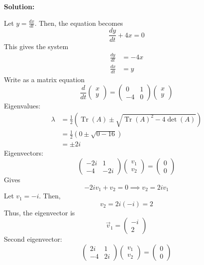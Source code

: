 \documentclass[12pt]{article}
\DeclareMathOperator{\Tr}{Tr}
\newenvironment{solution}{
    \textbf{Solution:}
    
}{
    
    \vspace{2em}
}
\begin{document}
\begin{solution}
    Let \(y = \frac{dx}{dt}\). Then, the equation becomes
    \[
        \frac{dy}{dt} + 4x = 0
    \]
    This gives the system
    \[
        \begin{aligned} 
            \frac{dy}{dt} &= -4x \\
            \frac{dx}{dt} &= y
        \end{aligned}
    \]
    Write as a matrix equation
    \[
        \frac{d}{dt} \begin{pmatrix} x \\ y \end{pmatrix} = \begin{pmatrix} 0 & 1 \\ -4 & 0 \end{pmatrix} \begin{pmatrix} x \\ y \end{pmatrix}
    \]
    Eigenvalues:
    \[
        \begin{aligned}
            \lambda &= \frac{1}{2}(\Tr(A) \pm \sqrt{\Tr(A)^2 - 4\det(A)}) \\
            &= \frac{1}{2}(0 \pm \sqrt{0 - 16}) \\
            &= \pm 2i
        \end{aligned}
    \]
    Eigenvectors:
    \[
        \begin{pmatrix} -2i & 1 \\ -4 & -2i \end{pmatrix} \begin{pmatrix} v_1 \\ v_2 \end{pmatrix} = \begin{pmatrix} 0 \\ 0 \end{pmatrix}
    \]
    Gives
    \[
        -2iv_1 + v_2 = 0 \implies v_2 = 2iv_1
    \]
    Let \(v_1 = -i\). Then,
    \[
        v_2 = 2i(-i) = 2
    \]
    Thus, the eigenvector is
    \[
        \vec{v}_1 = \begin{pmatrix} -i \\ 2 \end{pmatrix}
    \]
    Second eigenvector:
    \[
        \begin{pmatrix} 2i & 1 \\ -4 & 2i \end{pmatrix} \begin{pmatrix} v_1 \\ v_2 \end{pmatrix} = \begin{pmatrix} 0 \\ 0 \end{pmatrix}
\]
\end{solution}
\end{document}
